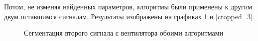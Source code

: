 \documentclass[12pt,a4paper]{article}
\begin{document}
Потом, не изменяя найденных параметров, алгоритмы были применены к другим двум оставшимся сигналам. Результаты изображены на графиках \ref{cropped_2} и \ref{cropped_3}.

\begin{figure}[h]
\begin{minipage}[h]{0.49\linewidth}
\end{minipage}
\begin{minipage}[h]{0.49\linewidth}
\end{minipage}
\caption{Сегментация второго сигнала с вентилятора обоими алгоритмами}
\label{cropped_2}
\end{figure}
\end{document}
